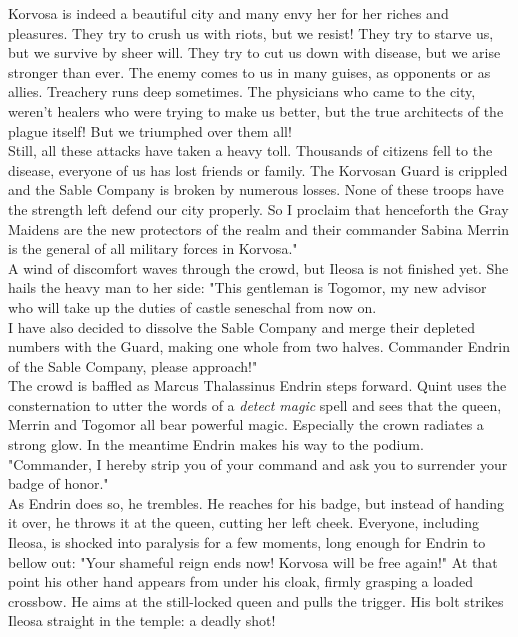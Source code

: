 Korvosa is indeed a beautiful city and many envy her for her riches and pleasures. They try to crush us with riots, but we resist! They try to starve us, but we survive by sheer will. They try to cut us down with disease, but we arise stronger than ever. The enemy comes to us in many guises, as opponents or as allies. Treachery runs deep sometimes. The physicians who came to the city, weren't healers who were trying to make us better, but the true architects of the plague itself! But we triumphed over them all!\\

Still, all these attacks have taken a heavy toll. Thousands of citizens fell to the disease, everyone of us has lost friends or family. The Korvosan Guard is crippled and the Sable Company is broken by numerous losses. None of these troops have the strength left defend our city properly. So I proclaim that henceforth the Gray Maidens are the new protectors of the realm and their commander Sabina Merrin is the general of all military forces in Korvosa."\\

A wind of discomfort waves through the crowd, but Ileosa is not finished yet. She hails the heavy man to her side: "This gentleman is Togomor, my new advisor who will take up the duties of castle seneschal from now on.\\

I have also decided to dissolve the Sable Company and merge their depleted numbers with the Guard, making one whole from two halves. Commander Endrin of the Sable Company, please approach!"\\

The crowd is baffled as Marcus Thalassinus Endrin steps forward. Quint uses the consternation to utter the words of a {\itshape detect magic} spell and sees that the queen, Merrin and Togomor all bear powerful magic. Especially the crown radiates a strong glow. In the meantime Endrin makes his way to the podium. "Commander, I hereby strip you of your command and ask you to surrender your badge of honor."\\

As Endrin does so, he trembles. He reaches for his badge, but instead of handing it over, he throws it at the queen, cutting her left cheek. Everyone, including Ileosa, is shocked into paralysis for a few moments, long enough for Endrin to bellow out: "Your shameful reign ends now! Korvosa will be free again!" At that point his other hand appears from under his cloak, firmly grasping a loaded crossbow. He aims at the still-locked queen and pulls the trigger. His bolt strikes Ileosa straight in the temple: a deadly shot!\\

